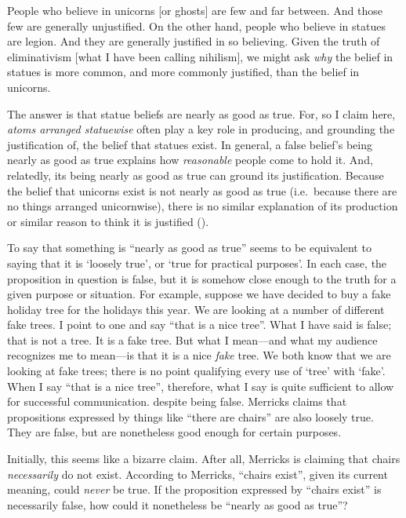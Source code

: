 \documentclass[11pt]{article}
\newenvironment{squote}{%
\begin{spacing}{1}
       	\begin{list}{}{%
\setlength{\labelwidth}{0pt}%
\rightmargin\leftmargin%
}
\item\relax
}{%
\end{list}%
\end{spacing}
}
\begin{document}
\begin{spacing}{1.25}
\begin{squote}
People who believe in unicorns [or ghosts] are few and far between.
And those few are generally unjustified.  On the other hand, people
who believe in statues are legion.  And they are generally justified
in so believing.  Given the truth of eliminativism [what I have been
  calling nihilism], we might ask {\em why} the belief in statues is
more common, and more commonly justified, than the belief in unicorns.

The answer is that statue beliefs are nearly as good as true.  For, so
I claim here, {\em atoms arranged statuewise} often play a key role in
producing, and grounding the justification of, the belief that statues
exist.  In general, a false belief's being nearly as good as true
explains how {\em reasonable} people come to hold it.  And, relatedly,
its being nearly as good as true can ground its justification.
Because the belief that unicorns exist is not nearly as good as true
(i.e.\ because there are no things arranged unicornwise), there is no
similar explanation of its production or similar reason to think it is
justified (\citeyear[171--172]{merricks2001a}).
\end{squote}

To say that something is ``nearly as good as true'' seems to be
equivalent to saying that it is `loosely true', or `true for practical
purposes'.  In each case, the proposition in question is false, but it
is somehow close enough to the truth for a given purpose or situation.
For example, suppose we have decided to buy a fake holiday tree for
the holidays this year.  We are looking at a number of different fake
trees.  I point to one and say ``that is a nice tree''.  What I have
said is false; that is not a tree.  It is a fake tree.  But what I
mean---and what my audience recognizes me to mean---is that it is a
nice {\em fake} tree.  We both know that we are looking at fake trees;
there is no point qualifying every use of `tree' with `fake'.  When I
say ``that is a nice tree'', therefore, what I say is quite sufficient
to allow for successful communication. despite being false.  Merricks
claims that propositions expressed by things like ``there are chairs''
are also loosely true.  They are false, but are nonetheless good
enough for certain purposes.

Initially, this seems like a bizarre claim.  After all, Merricks is
claiming that chairs {\em necessarily} do not exist.  According to
Merricks, ``chairs exist'', given its current meaning, could {\em
  never} be true.  If the proposition expressed by ``chairs exist'' is
necessarily false, how could it nonetheless be ``nearly as good as
true''?


\end{spacing}
\end{document}
